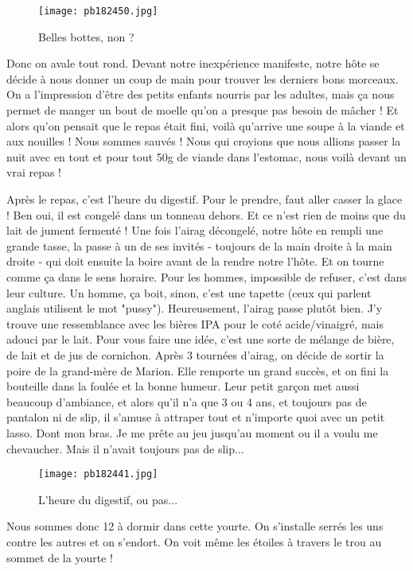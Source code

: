 \documentclass{book}
\begin{document}
\begin{wrapfigure}{l}{0.5\textwidth}
\centering
\texttt{[image: pb182450.jpg]}
\caption*{ Belles bottes, non ?}
\end{wrapfigure}


Donc on avale tout rond. Devant notre inexpérience manifeste, notre hôte se décide à nous donner un coup de main pour trouver les derniers bons morceaux. On a l'impression d'être des petits enfants nourris par les adultes, mais ça nous permet de manger un bout de moelle qu'on a presque pas besoin de mâcher ! Et alors qu'on pensait que le repas était fini, voilà qu'arrive une soupe à la viande et aux nouilles ! Nous sommes sauvés ! Nous qui croyions que nous allions passer la nuit avec en tout et pour tout 50g de viande dans l'estomac, nous voilà devant un vrai repas !

Après le repas, c'est l'heure du digestif. Pour le prendre, faut aller casser la glace ! Ben oui, il est congelé dans un tonneau dehors. Et ce n'est rien de moins que du lait de jument fermenté ! Une fois l'airag décongelé, notre hôte en rempli une grande tasse, la passe à un de ses invités - toujours de la main droite à la main droite - qui doit ensuite la boire avant de la rendre notre l'hôte. Et on tourne comme ça dans le sens horaire. Pour les hommes, impossible de refuser, c'est dans leur culture. Un homme, ça boit, sinon, c'est une tapette (ceux qui parlent anglais utilisent le mot "pussy"). Heureusement, l'airag passe plutôt bien. J'y trouve une ressemblance avec les bières IPA pour le coté acide/vinaigré, mais adouci par le lait. Pour vous faire une idée, c'est une sorte de mélange de bière, de lait et de jus de cornichon.
Après 3 tournées d'airag, on décide de sortir la poire de la grand-mère de Marion. Elle remporte un grand succès, et on fini la bouteille dans la foulée et la bonne humeur. Leur petit garçon met aussi beaucoup d'ambiance, et alors qu'il n'a que 3 ou 4 ans, et toujours pas de pantalon ni de slip, il s'amuse à attraper tout et n'importe quoi avec un petit lasso. Dont mon bras. Je me prête au jeu jusqu'au moment ou il a voulu me chevaucher. Mais il n'avait toujours pas de slip...


\begin{figure}[h]
\centering
\texttt{[image: pb182441.jpg]}
\caption*{ L'heure du digestif, ou pas...}
\end{figure}

Nous sommes donc 12 à dormir dans cette yourte. On s'installe serrés les uns contre les autres et on s'endort. On voit même les étoiles à travers le trou au sommet de la yourte !
\end{document}
